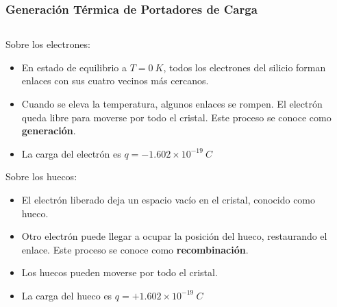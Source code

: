 \documentclass[10pt,t,aspectratio=169]{beamer}
\begin{document}
\begin{frame}[t]
  \frametitle{Generación Térmica de Portadores de Carga}

  \begin{columns}
  
    \begin{column}{0.85\textwidth}
    
      Sobre los electrones:
      
      \begin{itemize}
        \item En estado de equilibrio a $T=0\ K$, todos los electrones del silicio forman enlaces con sus cuatro vecinos más cercanos.
        \item Cuando se eleva la temperatura, algunos enlaces se rompen. El electrón queda libre para moverse por todo el cristal. Este proceso se conoce como \textbf{generación}.
        \item La carga del electrón es $\boxed{q=-1.602\times{}10^{-19}\ C}$
      \end{itemize}

      Sobre los huecos:
      
      \begin{itemize}
        \item El electrón liberado deja un espacio vacío en el cristal, conocido como hueco.
        \item Otro electrón puede llegar a ocupar la posición del hueco, restaurando el enlace. Este proceso se conoce como \textbf{recombinación}.
        \item Los huecos pueden moverse por todo el cristal.
        \item La carga del hueco es $\boxed{q=+1.602\times{}10^{-19}\ C}$
      \end{itemize}
      
    \end{column}
    
    \begin{column}{0.15\textwidth}
    

\end{column}
\end{columns}
\end{frame}
\end{document}
